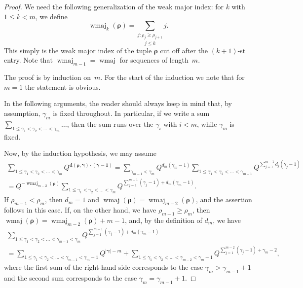 \documentclass[12pt,reqno]{amsart}
\numberwithin{equation}{section}
\theoremstyle{definition}
\DeclareMathOperator{\wmaj}{wmaj}
\newcommand{\rem}{{\boldsymbol\rho}}
\newcommand{\pos}{{\boldsymbol\gamma}}
\newcommand{\posi}{{\gamma}}
\begin{document}
\begin{proof}
We need the following generalization of the weak major index: for $k$ with $1 \le k < m$,
we define
$$
\wmaj_k(\rem)= \underset{j\le k}{\sum_{j:\rho_j \ge \rho_{j+1}}} j.
$$
This simply is the weak major index of the tuple $\rem$ cut off after
the {$(k+1)$-st entry.} Note that $\wmaj_{m-1}=\wmaj$ for sequences of
length~$m$. 

The proof is by induction on~$m$. For the start of the
induction we note that for $m=1$ the statement is obvious.

In the following arguments, the reader should always keep in mind
that, by assumption, $\posi_m$ is fixed throughout.
In particular, if we write a sum 
$\sum_{1 \le \posi_1 < \posi_2 < \dots < \posi_m} \dots$, then the
sum runs over the $\posi_i$ with $i<m$, while $\posi_m$ is fixed. 

Now, by the induction hypothesis, we may assume
\begin{multline*}
\sum_{1 \le \posi_1 < \posi_2 < \dots < \posi_m} Q^{{\mathbf d}(\rem, \pos) \cdot ({\pos- \mathbf 1})}
=\sum_{\posi_{m-1}<\posi_{m}} Q^{d_m(\gamma_m -1)} \sum_{1 \le \posi_1 < \posi_2 < \dots < \posi_{m-1}} Q^{\sum_{j=1}^{m-1} d_j(\posi_j-1)}\\ 
=Q^{-\wmaj_{m-2}(\rem)}
\sum_{1 \le \posi_1 < \posi_2 < \dots < \posi_m} Q^{\sum_{j=1}^{m-1} (\posi_j-1) + d_{m} (\posi_{m}-1)}.
\end{multline*}
If $\rho_{m-1} < \rho_m$, then $d_m=1$ and
$\wmaj(\rem)=\wmaj_{m-2}(\rem)$, and the assertion follows in this
case. If, on the other hand, we have $\rho_{m-1} \ge \rho_m$, then
$\wmaj(\rem)=\wmaj_{m-2}(\rem)+m-1$, and, by the definition of $d_m$, we
have
\begin{multline}
\label{left}
\sum_{1 \le \posi_1 < \posi_2 < \dots < \posi_{m-1} < \posi_m} Q^{\sum_{j=1}^{m-1} (\posi_j-1) + d_{m} (\posi_{m}-1)} \\
= \sum_{1 \le \posi_1 < \posi_2 < \dots < \posi_{m-1} < \posi_m-1} Q^{|\pos|-m}
+ \sum_{ 1 \le \posi_1 < \posi_2 < \dots < \posi_{m-2} < \posi_m-1} Q^{\sum_{j=1}^{m-2} (\posi_j-1)+\posi_{m}-2},
\end{multline}
where the first sum of the right-hand side corresponds to the case $\posi_m > \posi_{m-1}+1$ and the second sum corresponds to the case $\posi_m = \posi_{m-1}+1$.


\end{proof}
\end{document}
